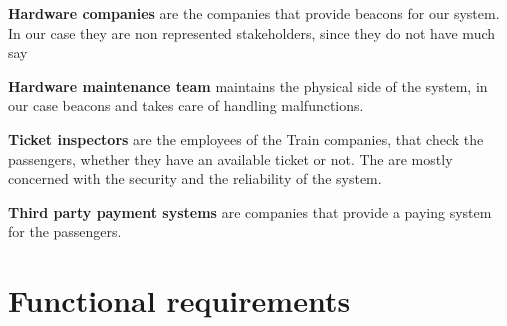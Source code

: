 \textbf{Hardware companies}  are the companies that provide beacons for our system. In our case they are non represented stakeholders, since they do not have much say  


\textbf{Hardware maintenance team} maintains the physical side of the system, in our case beacons and takes care of handling malfunctions.

\textbf{Ticket inspectors} are the employees of the Train companies, that check the passengers, whether they have an available ticket or not. The are mostly concerned with the security and the reliability of the system.

\textbf{Third party payment systems} are companies that provide a paying system for the passengers.  



\section{Functional requirements}

